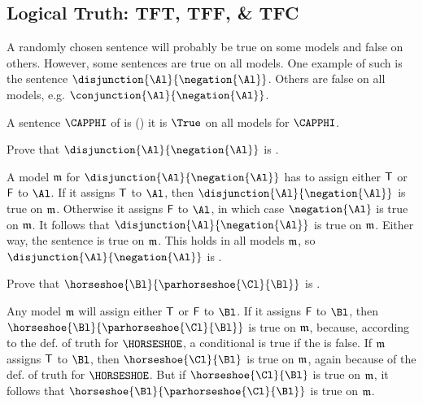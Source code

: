 \subsection{Logical Truth: TFT, TFF, \& TFC}\label{TFT TFF TFI}

A randomly chosen sentence will probably be true on some models and false on others. 
However, some sentences are true on all models. 
One example of such is the sentence $\disjunction{\Al}{\negation{\Al}}$.
Others are false on all models, e.g. $\conjunction{\Al}{\negation{\Al}}$.
\begin{majorILnc}{}
A sentence $\CAPPHI$ of \GSL{} is  () \Iff it is $\True$ on all models for $\CAPPHI$.
\end{majorILnc}

\begin{majorILnc}{}
	Prove that $\disjunction{\Al}{\negation{\Al}}$ is .
	\begin{PROOF}
		A model $\mathfrak{m}$ for $\disjunction{\Al}{\negation{\Al}}$ has to assign either $\mathsf{T}$ or $\mathsf{F}$ to $\Al$. 
		If it assigns $\mathsf{T}$ to $\Al$, then $\disjunction{\Al}{\negation{\Al}}$ is true on $\mathfrak{m}$.
		Otherwise it assigns $\mathsf{F}$ to $\Al$, in which case $\negation{\Al}$ is true on $\mathfrak{m}$.
		It follows that $\disjunction{\Al}{\negation{\Al}}$ is true on $\mathfrak{m}$.
		Either way, the sentence is true on $\mathfrak{m}$.
		This holds in all models $\mathfrak{m}$, so $\disjunction{\Al}{\negation{\Al}}$ is .		
	\end{PROOF}
\end{majorILnc}

\begin{majorILnc}{}
	Prove that $\horseshoe{\Bl}{\parhorseshoe{\Cl}{\Bl}}$ is \CAPS{tft}.
	\begin{PROOF}
		Any model $\mathfrak{m}$ will assign either $\mathsf{T}$ or $\mathsf{F}$ to $\Bl$. 
		If it assigns $\mathsf{F}$ to $\Bl$, then $\horseshoe{\Bl}{\parhorseshoe{\Cl}{\Bl}}$ is true on $\mathfrak{m}$, because, according to the def. of truth for $\HORSESHOE$, a conditional is true if the  is false.
		If $\mathfrak{m}$ assigns $\mathsf{T}$ to $\Bl$, then $\horseshoe{\Cl}{\Bl}$ is true on $\mathfrak{m}$, again because of the def. of truth for $\HORSESHOE$. 
		But if $\horseshoe{\Cl}{\Bl}$ is true on $\mathfrak{m}$, it follows that $\horseshoe{\Bl}{\parhorseshoe{\Cl}{\Bl}}$ is true on $\mathfrak{m}$. 
	\end{PROOF}
\end{majorILnc}%

